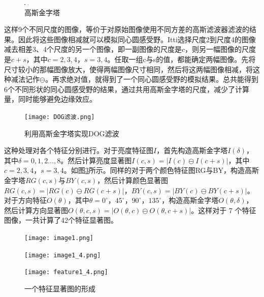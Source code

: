 \documentclass[a4paper,12pt]{article}
\begin{document}
\begin{figure}[!ht]
\begin{minipage}[c]{0.1\textwidth}
\centering
\includegraphics[width=0.01953125in]{figures/pyramidal_6.png}
\end{minipage}
\begin{minipage}[c]{0.1\textwidth}
\centering
\includegraphics[width=0.009765625in]{figures/pyramidal_7.png}
\end{minipage}
\caption{高斯金字塔}\label{fig:6}
\end{figure} 


这样9个不同尺度的图像，等价于对原始图像使用不同方差的高斯滤波器滤波的结果。因此将这些图像相减就可以模拟同心圆感受野。Itti选择尺度2到尺度4的图像减去相差3、4个尺度的另一个图像，即一副图像的尺度是$c$，则另一幅图像的尺度是$c+s$，其中$c=2,3,4$，$s=3,4$。任取一组c与s的值，都能确定两幅图像。先将尺寸较小的那幅图像放大，使得两幅图像尺寸相同，然后将这两幅图像相减，将这种减法记作$\ominus$。再求绝对值，就得到了一个同心圆感受野的模拟结果。总共能得到6个不同形状的同心圆感受野的结果，通过共用高斯金字塔的尺度，减少了计算量，同时能够避免边缘效应。

\begin{figure}[!htb]
\centering
\texttt{[image: DOG滤波.png]}
\caption{利用高斯金字塔实现DOG滤波}
\label{fig:7} 
\end{figure}

这种处理对各个特征分别进行。对于亮度特征图$I$，首先构造高斯金字塔$I(\delta)$，其中$\delta=0,1,2\ldots,8$。然后计算亮度显著图$I(c,s)=|I(c)\ominus I(c+s)|$，其中$c=2,3,4$，$s=3,4$。如图\ref{fig:8}所示。同样的对于两个颜色特征图RG与BY，构造高斯金字塔$RG(c,s)$与$BY(c,s)$，然后计算颜色显著图$RG(c,s)=|RG(c)\ominus RG(c+s)|$，$BY(c,s)=|BY(c)\ominus BY(c+s)|$。对于方向特征$O(\theta)$，其中$\theta=0^\circ，45^\circ，90^\circ，135^\circ$，构造高斯金字塔$O(\theta,\delta)$，然后计算方向显著图$O(\theta,c,s)=|O(\theta,c)\ominus O(\theta,c+s)|$。这样对于 7 个特征图像，一共计算了42个特征显著图。
\begin{figure}[!ht]
\begin{minipage}[c]{0.31\textwidth}
\centering
\texttt{[image: image1.png]}
\end{minipage}
\hspace{1ex}
\begin{minipage}[c]{0.31\textwidth}
\centering
\texttt{[image: image1\_4.png]}
\end{minipage}
\hspace{1ex}
\begin{minipage}[c]{0.31\textwidth}
\centering
\texttt{[image: feature1\_4.png]}
\end{minipage}
\caption{一个特征显著图的形成}\label{fig:8}
\end{figure} 
\end{document}
